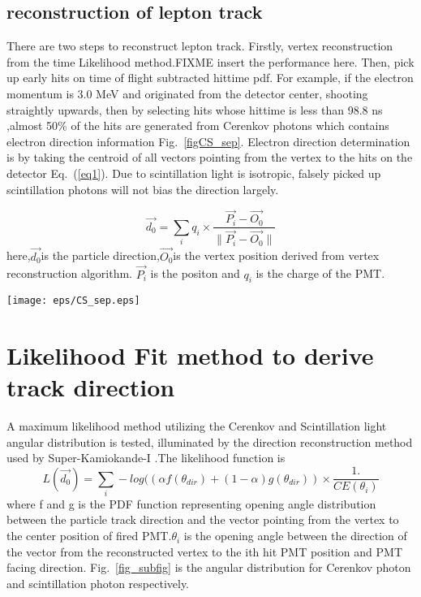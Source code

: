 \documentclass[a4paper,10pt]{cpc-hepnp}
\begin{document}
\subsection{reconstruction of lepton track}
There are two steps to reconstruct lepton track.
Firstly, vertex reconstruction from the time Likelihood method.FIXME insert
the performance here.
Then, pick up early hits on time of flight subtracted hittime pdf. For
example, if the electron momentum is 3.0 MeV and originated
from the detector center, shooting straightly upwards, then by selecting hits whose hittime is less than 98.8 ns ,almost 50\% of
the hits are generated from Cerenkov photons which contains electron direction information Fig.~\ref{figCS_sep}.
Electron direction determination is by taking the centroid of all vectors pointing from  the vertex to the hits on the
detector Eq.~(\ref{eq1}). Due to scintillation light is isotropic, falsely
picked up scintillation photons will not bias the direction largely.

\begin{equation}
\label{eq1}
\vec{d_0} = \sum_i{q_i\times{\frac{\vec{P_i}- \vec{O_0}}{\|\vec{P_i}-
\vec{O_0}\|}}}
\end{equation}
here,$\vec{d_0}$is the particle direction,$\vec{O_0}$is the vertex position
derived from vertex reconstruction algorithm.
 $\vec{P_i}$ is the positon and $q_i$ is the charge of the PMT.

\begin{center}
\texttt{[image: eps/CS\_sep.eps]}
\end{center}


\section{Likelihood Fit method to derive track direction}
A maximum likelihood method utilizing the Cerenkov and Scintillation light
angular distribution is tested, illuminated by the direction reconstruction
method used by Super-Kamiokande-I \cite{super-k-I}.The likelihood function is
\begin{equation}
\label{eq2}
L(\vec{d_0}) = \sum_i-log((\alpha f(\theta_{dir})+(1-\alpha)g(\theta_{dir}))\times\frac{1.}{CE(\theta_i)}
\end{equation}
where f and g is the PDF function representing opening angle distribution
between the particle track direction and the vector pointing from the vertex to
the center position of fired PMT.$\theta_i$ is the opening angle between the
direction of the vector from the reconstructed vertex to the ith hit PMT
position and PMT  facing  direction. Fig.~\ref{fig_subfig} is the angular distribution
for Cerenkov photon and scintillation photon respectively.
\end{document}
